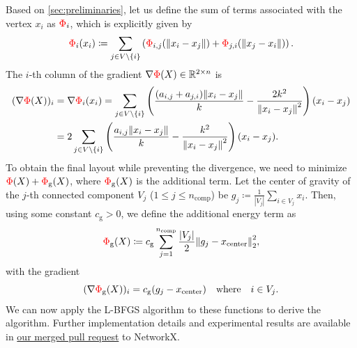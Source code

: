 \documentclass[11pt]{article}
\newcommand{\red}[1]{\textcolor{red}{#1}}
\begin{document}
Based on \cref{sec:preliminaries}, let us define the sum of terms associated with the vertex $x_{i}$ as $\red{\Phi}_{i}$, which is explicitly given by
\begin{equation*}
  \red{\Phi}_{i}(x_{i}) \coloneqq \sum_{j \in V \setminus \{i\}}\left( \red{\Phi}_{i,j}(\norm{x_{i}- x_{j}}
    ) + \red{\Phi}_{j,i}(\norm{x_{j}- x_{i}}) \right).
\end{equation*}
The $i$-th column of the gradient $\nabla \red{\Phi}(X) \in \mathbb{R}^{2 \times n}$ is
\begin{align*}
  (\nabla \red{\Phi}(X))_{i} & = \nabla \red{\Phi}_{i}(x_{i}) = \sum_{j \in V \setminus \{i\}}\left(\frac{(a_{i,j}+a_{j,i})\norm{ x_{i}- x_{j}}}{k}- \frac{2k^{2}}{\norm{ x_{i}- x_{j}}^{2}}\right) (x_{i}- x_{j}) \\
                             & = 2 \sum_{j \in V \setminus \{i\}}\left(\frac{a_{i,j}\norm{ x_{i}- x_{j}}}{k}- \frac{k^{2}}{\norm{ x_{i}- x_{j}}^{2}}\right) (x_{i}- x_{j}).
\end{align*}
To obtain the final layout while preventing the divergence, we need to minimize $\red{\Phi}(X) + \red{\Phi}_{\mathrm{g}}(X)$, where $\red{\Phi}_{\mathrm{g}}(X)$ is the additional term.
Let the center of gravity of the $j$-th connected component $V_{j}$ ($1 \leq j \leq n_{\mathrm{comp}}$) be $g_{j}\coloneqq \frac{1}{|V_{j}|}\sum_{i \in V_j}x_{i}$.
Then, using some constant $c_{\mathrm{g}}>0$, we define the additional energy term as
\begin{equation*}
  \red{\Phi}_{\mathrm{g}}(X) \coloneqq c_{\mathrm{g}}\sum_{j=1}^{n_{\mathrm{comp}}}\frac{\lvert V_{j}\rvert}{2}
  \norm{ g_{j} - x_{\mathrm{center}}}_{2}^{2},
\end{equation*}
with the gradient
\begin{equation*}
  (\nabla \red{\Phi}_{\mathrm{g}}(X))_{i}= c_{\mathrm{g}}(g_{j}- x_{\mathrm{center}}) \quad
  \text{where}\quad i \in V_{j}.
\end{equation*}
We can now apply the L-BFGS algorithm to these functions to derive the algorithm.
Further implementation details and experimental results are available in \href{https://github.com/networkx/networkx/pull/7889}{our merged pull request} to NetworkX.
\end{document}
